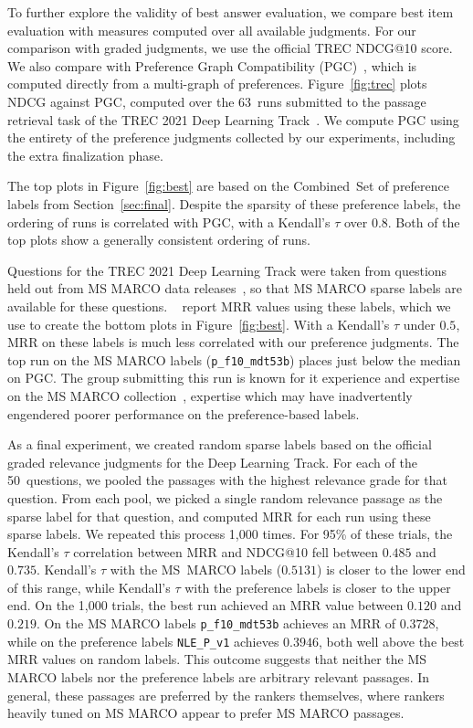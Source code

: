To further explore the validity of best answer evaluation, we compare best item evaluation with measures computed over all available judgments. For our comparison with graded judgments, we use the official TREC NDCG@10 score. We also compare with Preference Graph Compatibility (PGC)~\cite{lcs21}, which is computed directly from a multi-graph of preferences. Figure~\ref{fig:trec} plots NDCG against PGC, computed over the 63~runs submitted to the passage retrieval task of the TREC 2021 Deep Learning Track~\cite{DL21}.  We compute PGC using the entirety of the preference judgments collected by our experiments, including the extra finalization phase.

The top plots in Figure~\ref{fig:best} are based on the Combined~Set of preference labels from Section~\ref{sec:final}. Despite the sparsity of these preference labels, the ordering of runs is correlated with PGC, with a Kendall's $\tau$ over $0.8$. Both of the top plots show a generally consistent ordering of runs.

Questions for the TREC 2021 Deep Learning Track were taken from questions held out from MS MARCO data releases~\cite{DL21}, so that MS MARCO sparse labels are available for these questions. ~\citet{DL21} report MRR values using these labels, which we use to create the bottom plots in Figure~\ref{fig:best}. With a Kendall's $\tau$ under $0.5$, MRR on these labels is much less correlated with our preference judgments. The top run on the MS MARCO labels (\verb|p_f10_mdt53b|) places just below the median on PGC. The group submitting this run is known for it experience and expertise on the MS MARCO collection~\cite{h2oloo}, expertise which may have inadvertently engendered poorer performance on the preference-based labels.

As a final experiment, we created random sparse labels based on the official graded relevance judgments for the Deep Learning Track. For each of the 50~questions, we pooled the passages with the highest relevance grade for that question. From each pool, we picked a single random relevance passage as the sparse label for that question, and computed MRR for each run using these sparse labels. We repeated this process 1,000 times. For 95\% of these trials, the Kendall's $\tau$ correlation between MRR and NDCG@10 fell between $0.485$ and $0.735$. Kendall's $\tau$ with the MS~MARCO labels ($0.5131$) is closer to the lower end of this range, while Kendall's $\tau$ with the preference labels is closer to the upper end. On the 1,000 trials, the best run achieved an MRR value between $0.120$ and $0.219$. On the MS MARCO labels \verb|p_f10_mdt53b| achieves an MRR of $0.3728$, while on the preference labels \verb|NLE_P_v1| achieves $0.3946$, both well above the best MRR values on random labels. This outcome suggests that neither the MS MARCO labels nor the preference labels are arbitrary relevant passages. In general, these passages are preferred by the rankers themselves, where rankers heavily tuned on MS MARCO appear to prefer MS MARCO passages. 

